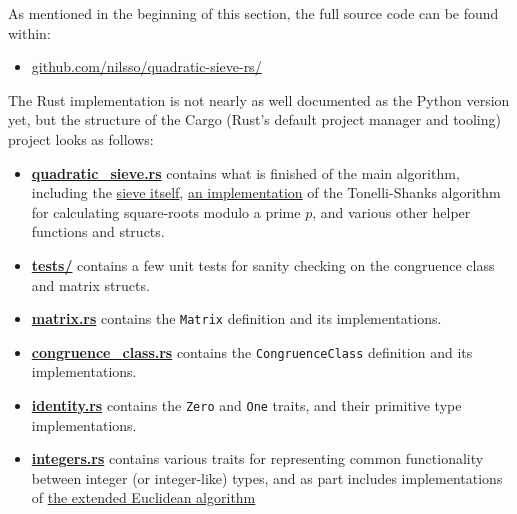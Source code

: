 \documentclass{report}
\begin{document}
\noindent
As mentioned in the beginning of this section, the full source code
can be found within:
\begin{itemize}
    \item \href{https://github.com/nilsso/quadratic-sieve-rs/tree/main/src}{github.com/nilsso/quadratic-sieve-rs/}
\end{itemize}
The Rust implementation is not nearly as well documented as the Python version
yet, but the structure of the Cargo (Rust's default project manager and
tooling) project looks as follows:
\begin{itemize}
    \item %
        \href{https://github.com/nilsso/quadratic-sieve-rs/blob/main/src/quadratic\_sieve.rs}{\textbf{quadratic\_sieve.rs}}
        contains what is finished of the main algorithm, including the
        \href{https://github.com/nilsso/quadratic-sieve-rs/blob/main/src/quadratic\_sieve.rs#L115}{sieve itself},
        \href{https://github.com/nilsso/quadratic-sieve-rs/blob/main/src/quadratic\_sieve.rs#L74}{an implementation}
        of the Tonelli-Shanks algorithm for calculating square-roots modulo a
        prime $p$, and various other helper functions and structs.
    \item %
        \href{https://github.com/nilsso/quadratic-sieve-rs/tree/main/tests}{\textbf{tests/}}
        contains a few unit tests for sanity checking on the congruence class
        and matrix structs.
    \item %
        \href{https://github.com/nilsso/quadratic-sieve-rs/blob/main/src/matrix.rs}{\textbf{matrix.rs}}
        contains the \Verb+Matrix+ definition and its implementations.
    \item %
        \href{https://github.com/nilsso/quadratic-sieve-rs/blob/main/src/congruence\_class.rs}{\textbf{congruence\_class.rs}}
        contains the \Verb+CongruenceClass+ definition and its implementations.
    \item %
        \href{https://github.com/nilsso/quadratic-sieve-rs/blob/main/src/identity.rs}{\textbf{identity.rs}}
        contains the \Verb+Zero+ and \Verb+One+ traits, and their primitive type
        implementations.
    \item %
        \href{https://github.com/nilsso/quadratic-sieve-rs/blob/main/src/integers.rs}{\textbf{integers.rs}}
        contains various traits for representing common functionality between
        integer (or integer-like) types, and as part includes implementations of
        \href{https://github.com/nilsso/quadratic-sieve-rs/blob/main/src/integers.rs#L13}{the extended Euclidean algorithm}

\end{itemize}
\end{document}
